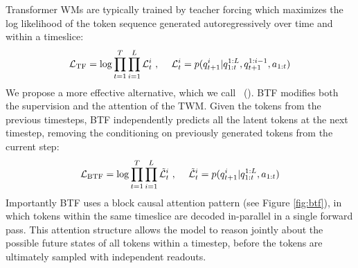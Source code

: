 

Transformer WMs are typically trained by teacher forcing which maximizes
the log likelihood of the token sequence generated autoregressively over time
and within a timeslice:
\vspace{-.75em}
\begin{equation}
\small
    \mathcal{L}_{\text{TF}} = 
    \log \prod_{t=1}^{T} \prod_{i=1}^L \mathcal{L}_t^i ~,~~~~
    \mathcal{L}_t^i
    =
    p(q_{t+1}^i | q_{1:t}^{1:L},  q_{t+1}^{1:i-1}, a_{1:t})
    \label{eqn:lossAR}
\end{equation}
We propose a more effective alternative, which we call
\btf~(\btfac).
BTF modifies both the supervision and the attention of the TWM. Given the tokens from the previous timesteps,
BTF independently predicts all the latent tokens at the next timestep, removing the conditioning on previously generated tokens from the current step:
\vspace{-.5em}
\begin{equation}
\small
    \mathcal{L}_{\text{BTF}} = 
    \log \prod_{t=1}^{T} \prod_{i=1}^L \mathcal{\tilde{L}}_t^i ~,~~~~
    \mathcal{\tilde{L}}_t^i
    =
    p(q_{t+1}^i | q_{1:t}^{1:L}, a_{1:t})
    \label{eqn:lossBTF}
\vspace{-.4em}
\end{equation}
Importantly BTF uses a block causal attention pattern (see Figure \ref{fig:btf}), in which tokens within the same timeslice are decoded in-parallel in a single forward pass.
This attention structure allows the model to reason jointly about the possible future states of all tokens within a timestep, before the tokens are ultimately sampled with independent readouts.
